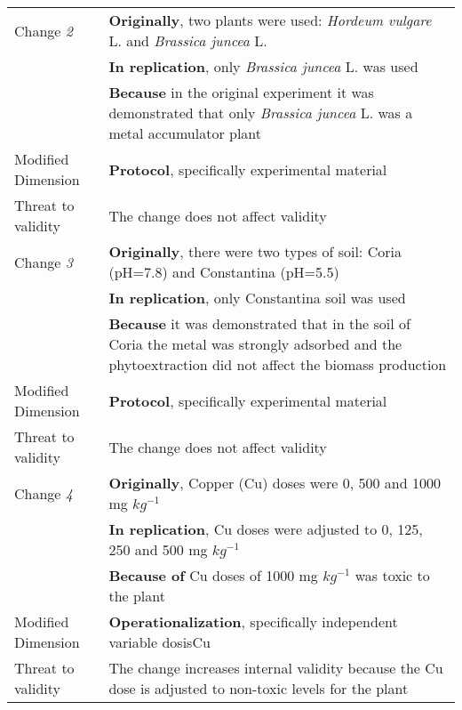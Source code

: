 \begin{table*}[h]
\begin{tabularx}{\textwidth}{
        >{\hsize=0.3\hsize}X
        >{\hsize=0.7\hsize}X}
\hline
    Change \textit{2}   & 
        \textbf{Originally}, two plants were used: \emph{Hordeum vulgare} L. and \emph{Brassica juncea} L. \\& \textbf{In replication}, only \emph{Brassica juncea} L. was used \\& \textbf{Because} in the original experiment it was demonstrated that only \emph{Brassica juncea} L. was a metal accumulator plant\\  

    Modified Dimension & 
        \textbf{Protocol}, specifically experimental material \\   
        
    Threat to validity  & 
        The change does not affect validity  \\  
        
\hline
    Change \textit{3}   & 
        \textbf{Originally}, there were two types of soil: Coria (pH=7.8) and Constantina (pH=5.5) \\& \textbf{In replication}, only Constantina soil was used \\& \textbf{Because} it was demonstrated that in the soil of Coria the metal was strongly adsorbed and the phytoextraction did not affect the biomass production   \\  
    Modified Dimension & 
        \textbf{Protocol}, specifically experimental material \\   
    
    Threat to validity  & 
        The change does not affect validity  \\  
        
\hline
    Change \textit{4}   & 
        \textbf{Originally}, Copper (Cu) doses were 0, 500 and 1000 mg $kg^{-1}$ \\& \textbf{In replication}, Cu doses were adjusted to 0, 125, 250 and 500 mg $kg^{-1}$     \\ 
        & \textbf{Because of} Cu doses of 1000 mg $kg^{-1}$ was toxic to the plant \\  
 
    Modified Dimension & 
        \textbf{Operationalization}, specifically independent variable dosisCu \\
        
    Threat to validity & 
        The change increases internal validity because the Cu dose is adjusted to non-toxic levels for the plant \\ 


\end{tabularx}
\end{table*}
